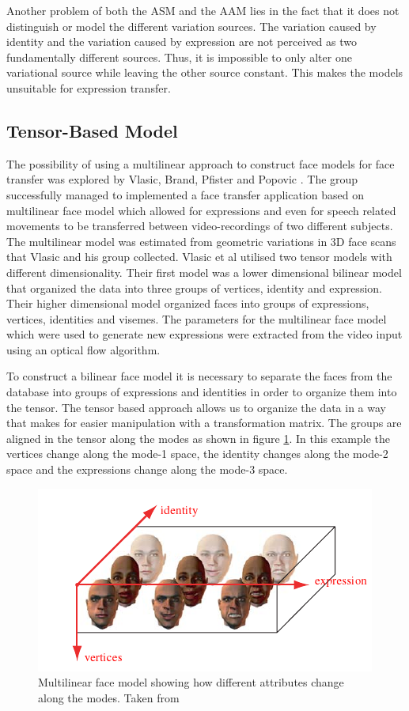 \documentclass[11pt,a4paper]{report}
\begin{document}
Another problem of both the ASM and the AAM lies in the fact that it does not
distinguish or model the different variation sources. The variation caused by
identity and the variation caused by expression are not perceived as two
fundamentally different sources. Thus, it is impossible to only alter one
variational source while leaving the other source constant. This makes the
models unsuitable for expression transfer.

\subsection{Tensor-Based Model}\label{works}
The possibility of using a multilinear approach to construct face models for face transfer was explored
by Vlasic, Brand, Pfister and Popovic \cite{faceTransfer05}. The group
successfully managed to implemented a face transfer application based on
multilinear face model which allowed for expressions and even for speech related
movements to be transferred between video-recordings of two different subjects. The multilinear
model was estimated from geometric variations in 3D face scans that Vlasic and
his group collected. Vlasic et al utilised two tensor models with
different dimensionality. Their first model was a lower dimensional bilinear model that organized the data into three
groups of vertices, identity and expression. Their higher dimensional model
organized faces into groups of expressions, vertices, identities and visemes. The parameters for the multilinear face model which were used to generate new expressions were
extracted from the video input using an optical flow algorithm.

To construct a bilinear face model it is necessary to separate the faces from the
database into groups of expressions and identities in order to organize them
into the tensor. The tensor based approach allows us to organize
the data in a way that makes for easier manipulation with a transformation
matrix. The groups are aligned in the tensor along the modes as shown in figure
\ref{gr:tensor}. In this example the vertices change along the mode-1 space, the identity changes
along the mode-2 space and the expressions change along the mode-3 space. 
\begin{figure}[H]
\centering
\includegraphics[scale=0.8]{images/modes_faces.png}
\caption{Multilinear face model showing how different attributes change along
  the modes. Taken from \cite{faceTransfer05} }
\label{gr:tensor}
\end{figure}
\end{document}
